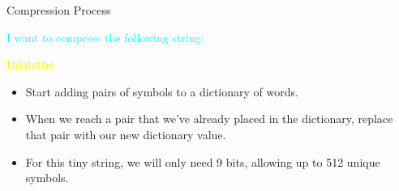 \documentclass{beamer}
\begin{document}
\begin{frame}{Compression Process}
    \textcolor{cyan}{
        I want to compress the following string: \\
        \begin{center}
        \textcolor{yellow}{
        \textbf{\large thisisthe}
        }
        \end{center}
    }    
    \begin{itemize}[label=]
        \color{lime}
        \item <1->Start adding pairs of symbols to a dictionary of words.
        \item <2-> When we reach a pair that we've already placed in the dictionary, replace that pair with our new dictionary value.
        \item <3-> For this tiny string, we will only need 9 bits, allowing up to 512 unique symbols.
    \end{itemize}
\end{frame}
\end{document}
